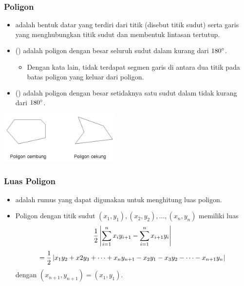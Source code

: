 \begin{frame}
\frametitle{Poligon}
\begin{itemize}
  \item {} adalah bentuk datar yang terdiri dari titik (disebut titik sudut) serta garis yang menghubungkan titik sudut dan membentuk lintasan tertutup.
  \item {} (\xspace) adalah poligon dengan besar seluruh sudut dalam kurang dari $180\degree$.
  \begin{itemize}

    \item Dengan kata lain, tidak terdapat segmen garis di antara dua titik pada batas poligon yang keluar dari poligon.
  \end{itemize}
  \item {} (\xspace) adalah poligon dengan besar setidaknya satu sudut dalam tidak kurang dari $180\degree$.
\end{itemize}
\begin{center}
  \includegraphics[width=6cm]{asset/polygon-convex-concave.png}
\end{center}
\end{frame}

\begin{frame}
\frametitle{Luas Poligon}
\begin{itemize}
  \item {} adalah rumus yang dapat digunakan untuk menghitung luas poligon.
  \item Poligon dengan titik sudut $(x_1, y_1), (x_2, y_2), \dots, (x_n, y_n)$ memiliki luas
  \[\frac{1}{2}\left\lvert\sum_{i=1}^n x_iy_{i+1} - \sum_{i=1}^n x_{i+1}y_i\right\rvert\]
  \[= \frac{1}{2}\left\lvert x_1y_2 + x2y_3 + \dots + x_ny_{n+1} - x_2y_1 - x_3y_2 - \dots - x_{n+1}y_n\right\rvert\]
  dengan $(x_{n+1}, y_{n+1}) = (x_1, y_1)$.
\end{itemize}
\end{frame}


